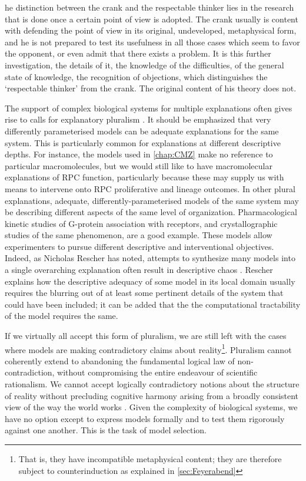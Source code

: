 \begin{longquote}
[T]he distinction between the crank and the respectable thinker lies in the research that is done once a certain point of view is adopted. The crank usually is content with defending the point of view in its original, undeveloped, metaphysical form, and he is not prepared to test its usefulness in all those cases which seem to favor the opponent, or even admit that there exists a problem. It is this further investigation, the details of it, the knowledge of the difficulties, of the general state of knowledge, the recognition of objections, which distinguishes the ‘respectable thinker’ from the crank. The original content of his theory does not.
\cite[pp.199]{Feyerabend1981}
\end{longquote}

The support of complex biological systems for multiple explanations often gives rise to calls for explanatory pluralism \cite{Brigandt2010}. It should be emphasized that very differently parameterised models can be adequate explanations for the same system. This is particularly common for explanations at different descriptive depths. For instance, the models used in \autoref{chap:CMZ} make no reference to particular macromolecules, but we would still like to have macromolecular explanations of RPC function, particularly because these may supply us with means to intervene onto RPC proliferative and lineage outcomes. In other plural explanations, adequate, differently-parameterised models of the same system may be describing different aspects of the same level of organization. Pharmacological kinetic studies of G-protein association with receptors, and crystallographic studies of the same phenomenon, are a good example. These models allow experimenters to pursue different descriptive and interventional objectives. Indeed, as Nicholas Rescher has noted, attempts to synthesize many models into a single overarching explanation often result in descriptive chaos \cite[p.65-6]{Rescher2000}. Rescher explains how the descriptive adequacy of some model in its local domain usually requires the blurring out of at least some pertinent details of the system that could have been included; it can be added that the the computational tractability of the model requires the same.

If we virtually all accept this form of pluralism, we are still left with the cases where models are making contradictory claims about reality\footnote{That is, they have incompatible metaphysical content; they are therefore subject to counterinduction as explained in \autoref{sec:Feyerabend}}. Pluralism cannot coherently extend to abandoning the fundamental logical law of non-contradiction, without compromising the entire endeavour of scientific rationalism. We cannot accept logically contradictory notions about the structure of reality without precluding cognitive harmony arising from a broadly consistent view of the way the world works \cite{Rescher2005}. Given the complexity of biological systems, we have no option except to express models formally and to test them rigorously against one another. This is the task of model selection.

